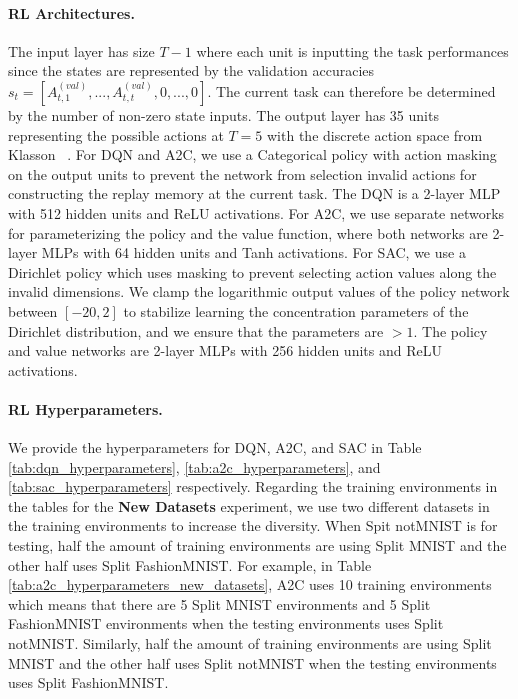 \paragraph{RL Architectures.}
The input layer has size $T-1$ where each unit is inputting the task performances since the states are represented by the validation accuracies $s_t = [A_{t, 1}^{(val)}, ..., A_{t, t}^{(val)}, 0, ..., 0]$. The current task can therefore be determined by the number of non-zero state inputs. 
The output layer has 35 units representing the possible actions at $T=5$ with the discrete action space from Klasson \etal~. 
For DQN and A2C, we use a Categorical policy with action masking on the output units to prevent the network from selection invalid actions for constructing the replay memory at the current task. The DQN is a 2-layer MLP with 512 hidden units and ReLU activations. For A2C, we use separate networks for parameterizing the policy and the value function, where both networks are 2-layer MLPs with 64 hidden units and Tanh activations. 
For SAC, we use a Dirichlet policy which uses masking to prevent selecting action values along the invalid dimensions. We clamp the logarithmic output values of the policy network between $[-20, 2]$ to stabilize learning the concentration parameters of the Dirichlet distribution, and we ensure that the parameters are $>1$. The policy and value networks are 2-layer MLPs with 256 hidden units and ReLU activations. 


\vspace{-3mm}
\paragraph{RL Hyperparameters.}
We provide the hyperparameters for DQN, A2C, and SAC in Table \ref{tab:dqn_hyperparameters}, \ref{tab:a2c_hyperparameters}, and \ref{tab:sac_hyperparameters} respectively.
Regarding the training environments in the tables for the \textbf{New Datasets} experiment, we use two different datasets in the training environments to increase the diversity. When Spit notMNIST is for testing, half the amount of training environments are using Split MNIST and the other half uses Split FashionMNIST. For example, in Table \ref{tab:a2c_hyperparameters_new_datasets}, A2C uses 10 training environments which means that there are 5 Split MNIST environments and 5 Split FashionMNIST environments when the testing environments uses Split notMNIST. Similarly, half the amount of training environments are using Split MNIST and the other half uses Split notMNIST when the testing environments uses Split FashionMNIST.   

